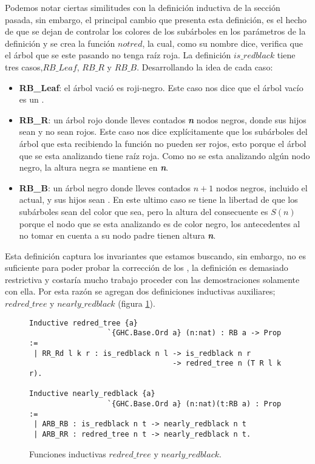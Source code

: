 Podemos notar ciertas similitudes con la definición inductiva de la secci\'on pasada, sin
embargo, el principal cambio que presenta esta definición, es el hecho de que se dejan de controlar
los colores de los subárboles en los parámetros de la definici\'on y se crea la funci\'on $notred$,
la cual, como su nombre dice, verifica que el \'arbol que se este pasando no tenga raíz roja. La
definici\'on $is\_redblack$ tiene tres casos,$RB\_Leaf$, $RB\_R$ y $RB\_B$. Desarrollando la idea de cada caso:

\begin{itemize}
        \item \textbf{RB\_Leaf}: el árbol vació es roji-negro. Este caso nos dice que el \'arbol
        vacío es un {\arn}.
        \item \textbf{RB\_R}: un árbol rojo donde lleves contados \textbf{\textit{n}} nodos negros, donde sus
        hijos sean{\arns} y no sean rojos. Este caso nos dice explícitamente que los subárboles
        del árbol que esta recibiendo la función no pueden ser rojos, esto porque el árbol que se
        esta analizando tiene raíz roja. Como no se esta analizando algún nodo negro, la altura
        negra se mantiene en \textbf{\textit{n}}.
        \item \textbf{RB\_B}: un árbol negro donde lleves contados $n+1$ nodos negros, incluido
        el actual, y sus hijos sean {\arns}. En este ultimo caso se tiene la libertad de que los
        subárboles sean del color que sea, pero la altura del consecuente es $S(n)$ porque el nodo
        que se esta analizando es de color negro, los antecedentes al no tomar en cuenta a su nodo
        padre tienen altura \textbf{\textit{n}}.
\end{itemize}

Esta definici\'on captura los invariantes que estamos buscando, sin embargo, no es suficiente para
poder probar la correcci\'on de los {\arns}, la definici\'on es demasiado restrictiva y costaría mucho
trabajo proceder con las demostraciones solamente con ella. Por esta razón se agregan dos
definiciones inductivas auxiliares; $redred\_tree$ y $nearly\_redblack$ (figura \ref{inductive_aux}).

\begin{figure}[!ht]
\centering
\captionsetup{justification=centering}
\begin{verbatim}
Inductive redred_tree {a}
                  `{GHC.Base.Ord a} (n:nat) : RB a -> Prop :=
 | RR_Rd l k r : is_redblack n l -> is_redblack n r
                                 -> redred_tree n (T R l k r).

Inductive nearly_redblack {a}
                  `{GHC.Base.Ord a} (n:nat)(t:RB a) : Prop :=
 | ARB_RB : is_redblack n t -> nearly_redblack n t
 | ARB_RR : redred_tree n t -> nearly_redblack n t.
\end{verbatim}
\caption{Funciones inductivas $redred\_tree$ y $nearly\_redblack$.}
\label{inductive_aux}
\end{figure}

